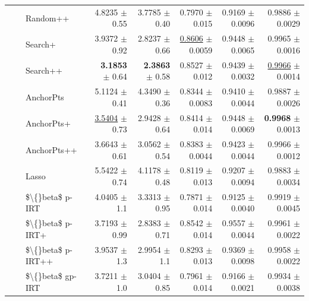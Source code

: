 \begin{longtable}{llp{}rrrrr}
 &  & Random++ & 4.8235 {\scriptsize $\pm$ 0.55} & 3.7785 {\scriptsize $\pm$ 0.40} & 0.7970 {\scriptsize $\pm$ 0.015} & 0.9169 {\scriptsize $\pm$ 0.0096} & 0.9886 {\scriptsize $\pm$ 0.0029} \\
 &  & Search+ & 3.9372 {\scriptsize $\pm$ 0.92} & 2.8237 {\scriptsize $\pm$ 0.66} & \underline{0.8606} {\scriptsize $\pm$ 0.0059} & 0.9448 {\scriptsize $\pm$ 0.0065} & 0.9965 {\scriptsize $\pm$ 0.0016} \\
 &  & Search++ & \textbf{3.1853} {\scriptsize $\pm$ 0.64} & \textbf{2.3863} {\scriptsize $\pm$ 0.58} & 0.8527 {\scriptsize $\pm$ 0.012} & 0.9439 {\scriptsize $\pm$ 0.0032} & \underline{0.9966} {\scriptsize $\pm$ 0.0014} \\
 &  & AnchorPts & 5.1124 {\scriptsize $\pm$ 0.41} & 4.3490 {\scriptsize $\pm$ 0.36} & 0.8344 {\scriptsize $\pm$ 0.0083} & 0.9410 {\scriptsize $\pm$ 0.0044} & 0.9887 {\scriptsize $\pm$ 0.0026} \\
 &  & AnchorPts+ & \underline{3.5404} {\scriptsize $\pm$ 0.73} & 2.9428 {\scriptsize $\pm$ 0.64} & 0.8414 {\scriptsize $\pm$ 0.014} & 0.9448 {\scriptsize $\pm$ 0.0069} & \textbf{0.9968} {\scriptsize $\pm$ 0.0013} \\
 &  & AnchorPts++ & 3.6643 {\scriptsize $\pm$ 0.61} & 3.0562 {\scriptsize $\pm$ 0.54} & 0.8383 {\scriptsize $\pm$ 0.0044} & 0.9423 {\scriptsize $\pm$ 0.0044} & 0.9966 {\scriptsize $\pm$ 0.0012} \\
 &  & Lasso & 5.5422 {\scriptsize $\pm$ 0.74} & 4.1178 {\scriptsize $\pm$ 0.48} & 0.8119 {\scriptsize $\pm$ 0.013} & 0.9207 {\scriptsize $\pm$ 0.0094} & 0.9883 {\scriptsize $\pm$ 0.0034} \\
 &  & \$\textbackslash\{\}beta\$ p-IRT & 4.0405 {\scriptsize $\pm$ 1.1} & 3.3313 {\scriptsize $\pm$ 0.95} & 0.7871 {\scriptsize $\pm$ 0.014} & 0.9125 {\scriptsize $\pm$ 0.0040} & 0.9919 {\scriptsize $\pm$ 0.0045} \\
 &  & \$\textbackslash\{\}beta\$ p-IRT+ & 3.7193 {\scriptsize $\pm$ 0.99} & 2.8383 {\scriptsize $\pm$ 0.71} & 0.8542 {\scriptsize $\pm$ 0.014} & 0.9557 {\scriptsize $\pm$ 0.0044} & 0.9961 {\scriptsize $\pm$ 0.0022} \\
 &  & \$\textbackslash\{\}beta\$ p-IRT++ & 3.9537 {\scriptsize $\pm$ 1.3} & 2.9954 {\scriptsize $\pm$ 1.1} & 0.8293 {\scriptsize $\pm$ 0.013} & 0.9369 {\scriptsize $\pm$ 0.0098} & 0.9958 {\scriptsize $\pm$ 0.0022} \\
 &  & \$\textbackslash\{\}beta\$ gp-IRT & 3.7211 {\scriptsize $\pm$ 1.0} & 3.0404 {\scriptsize $\pm$ 0.85} & 0.7961 {\scriptsize $\pm$ 0.014} & 0.9166 {\scriptsize $\pm$ 0.0021} & 0.9934 {\scriptsize $\pm$ 0.0038} \\

\end{longtable}
